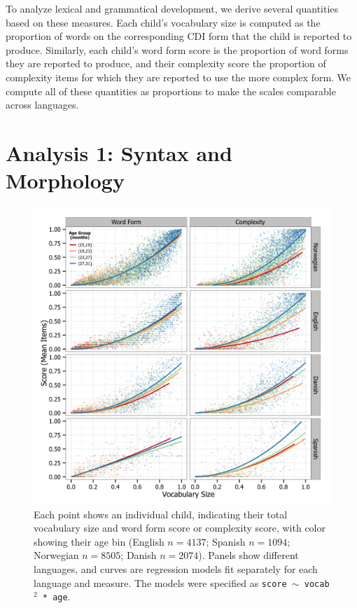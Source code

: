 \documentclass[10pt,letterpaper]{article}
\begin{document}
To analyze lexical and grammatical development, we derive several quantities based on these measures. Each child's vocabulary size is computed as the proportion of words on the corresponding CDI form that the child is reported to produce. Similarly, each child's word form score is the proportion of word forms they are reported to produce, and their complexity score the proportion of complexity items for which they are reported to use the more complex form. We compute all of these quantities as proportions to make the scales comparable across languages.

\section{Analysis 1: Syntax and Morphology}

\begin{figure}[t!]
\centering
\includegraphics[width=.75\textwidth]{plots/grammar.png}
\caption{\label{fig:grammar} Each point shows an individual child, indicating their total vocabulary size and word form score or complexity score, with color showing their age bin (English $n=4137$; Spanish $n=1094$; Norwegian $n=8505$; Danish $n=2074$). Panels show different languages, and curves are regression models fit separately for each language and measure. The models were specified as \small{\tt{score $\sim$ vocab$^{2}$ * age}}.} 
\end{figure}
\end{document}
